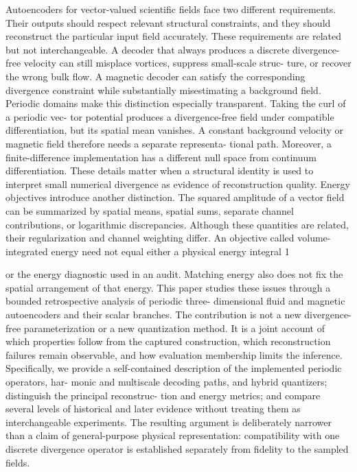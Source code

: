 \documentclass[11pt]{article}
\begin{document}
Autoencoders for vector-valued scientific fields face two different requirements. Their outputs
should respect relevant structural constraints, and they should reconstruct the particular input
field accurately. These requirements are related but not interchangeable. A decoder that always
produces a discrete divergence-free velocity can still misplace vortices, suppress small-scale struc-
ture, or recover the wrong bulk flow. A magnetic decoder can satisfy the corresponding divergence
constraint while substantially misestimating a background field.
Periodic domains make this distinction especially transparent. Taking the curl of a periodic vec-
tor potential produces a divergence-free field under compatible differentiation, but its spatial mean
vanishes. A constant background velocity or magnetic field therefore needs a separate representa-
tional path. Moreover, a finite-difference implementation has a different null space from continuum
differentiation. These details matter when a structural identity is used to interpret small numerical
divergence as evidence of reconstruction quality.
Energy objectives introduce another distinction. The squared amplitude of a vector field can
be summarized by spatial means, spatial sums, separate channel contributions, or logarithmic
discrepancies. Although these quantities are related, their regularization and channel weighting
differ. An objective called volume-integrated energy need not equal either a physical energy integral
1

or the energy diagnostic used in an audit. Matching energy also does not fix the spatial arrangement
of that energy.
This paper studies these issues through a bounded retrospective analysis of periodic three-
dimensional fluid and magnetic autoencoders and their scalar branches. The contribution is not a
new divergence-free parameterization or a new quantization method. It is a joint account of which
properties follow from the captured construction, which reconstruction failures remain observable,
and how evaluation membership limits the inference.
Specifically, we provide a self-contained description of the implemented periodic operators, har-
monic and multiscale decoding paths, and hybrid quantizers; distinguish the principal reconstruc-
tion and energy metrics; and compare several levels of historical and later evidence without treating
them as interchangeable experiments. The resulting argument is deliberately narrower than a claim
of general-purpose physical representation: compatibility with one discrete divergence operator is
established separately from fidelity to the sampled fields.
\end{document}

